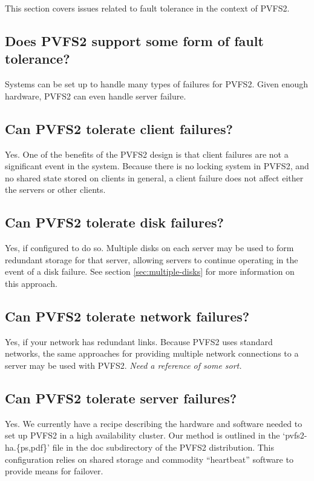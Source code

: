 \documentclass[11pt,letterpaper]{article}
\begin{document}
This section covers issues related to fault tolerance in the context of PVFS2.

\subsection{Does PVFS2 support some form of fault tolerance?}

Systems can be set up to handle many types of failures for PVFS2.  Given enough
hardware, PVFS2 can even handle server failure.

\subsection{Can PVFS2 tolerate client failures?}

Yes.  One of the benefits of the PVFS2 design is that client failures are not a
significant event in the system.  Because there is no locking system in PVFS2,
and no shared state stored on clients in general, a client failure does not
affect either the servers or other clients.

\subsection{Can PVFS2 tolerate disk failures?}

Yes, if configured to do so.  Multiple disks on each server may be used to
form redundant storage for that server, allowing servers to continue operating
in the event of a disk failure.  See section \ref{sec:multiple-disks} for more
information on this approach.

\subsection{Can PVFS2 tolerate network failures?}

Yes, if your network has redundant links.  Because PVFS2 uses standard
networks, the same approaches for providing multiple network connections to a
server may be used with PVFS2.  \emph{Need a reference of some sort.}

\subsection{Can PVFS2 tolerate server failures?}

Yes.  We currently have a recipe describing the hardware and software
needed to set up PVFS2 in a high availability cluster.  Our method is
outlined in the `pvfs2-ha.\{ps,pdf\}' file in the doc subdirectory of the
PVFS2 distribution.  This configuration relies on shared storage and
commodity ``heartbeat'' software to provide means for failover.
\end{document}
